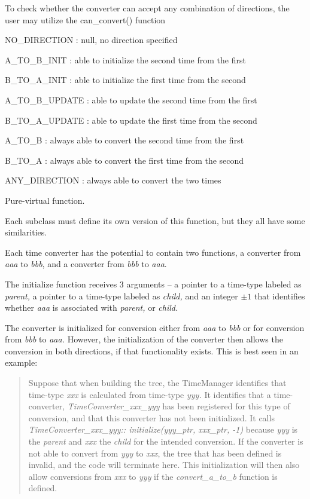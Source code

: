 {\begin{enumerate}
{\begin{enumerate}
To check whether the converter can accept any combination of directions, the 
user may utilize the can\_convert() function

NO\_DIRECTION : null, no direction specified

A\_TO\_B\_INIT : able to initialize the second time from the first

B\_TO\_A\_INIT : able to initialize the first time from the second

A\_TO\_B\_UPDATE : able to update the second time from the first

B\_TO\_A\_UPDATE : able to update the first time from the second

A\_TO\_B : always able to convert the second time from the first

B\_TO\_A : always able to convert the first time from the second

ANY\_DIRECTION : always able to convert the two times


\label{ref:TimeConverterinitialize} 
Pure-virtual function.

Each subclass must define its own version of this function, but they
all have some similarities.

Each time converter has the potential to contain two functions, a
converter from \textit{aaa} to \textit{bbb}, and a converter from
\textit{bbb} to \textit{aaa}.

The initialize function receives 3 arguments -- a pointer to a
time-type labeled as \textit{parent, }a pointer to a time-type labeled
as \textit{child, }and an integer  $\pm 1$ that identifies whether
\textit{aaa }is associated with \textit{parent, }or \textit{child.}

The converter is initialized for conversion either from \textit{aaa} to
\textit{bbb }or for conversion from \textit{bbb} to\textit{ aaa.
}However, the initialization of the converter then allows the
conversion in both directions, if that functionality exists.  This is
best seen in an example:

\begin{quotation}
Suppose that when building the tree, the TimeManager identifies that
time-type \textit{xxx} is calculated from time-type \textit{yyy.  }It
identifies that a time-converter, \textit{TimeConverter\_xxx\_yyy} has
been registered for this type of conversion, and that this converter
has not been initialized.  It calls
\textit{TimeConverter\_xxx\_yyy:: initialize(yyy\_ptr, xxx\_ptr, -1)}
because \textit{yyy} is the \textit{parent} and \textit{xxx} the
\textit{child} for the intended conversion.  If the converter is not
able to convert from \textit{yyy} to \textit{xxx}, the tree that has
been defined is invalid, and the code will terminate here.  This
initialization will then also allow conversions from \textit{xxx }to
\textit{yyy} if the \textit{convert\_a\_to\_b} function is defined.
\end{quotation}


\end{enumerate}}
\end{enumerate}}
